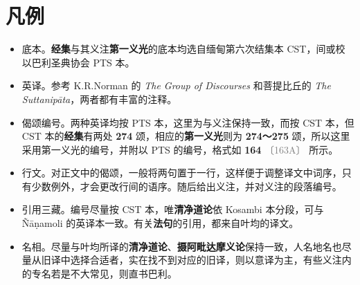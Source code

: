 \chapter{凡例}

\begin{itemize}
    \item 底本。\textbf{经集}与其义注\textbf{第一义光}的底本均选自缅甸第六次结集本 CST，间或校以巴利圣典协会 PTS 本。
    \item 英译。参考 K.R.Norman 的 \textit{The Group of Discourses} 和菩提比丘的 \textit{The Suttanipāta}，两者都有丰富的注释。
    \item 偈颂编号。两种英译均按 PTS 本，这里为与义注保持一致，而按 CST 本，但 CST 本的\textbf{经集}有两处 \textbf{274} 颂，相应的\textbf{第一义光}则为 \textbf{274～275} 颂，所以这里采用第一义光的编号，并附以 PTS 的编号，格式如 \textbf{164} \textcolor{gray}{\footnotesize 〔163A〕} 所示。
    \item 行文。对正文中的偈颂，一般将两句置于一行，这样便于调整译文中词序，只有少数例外，才会更改行间的语序。随后给出义注，并对义注的段落编号。
    \item 引用三藏。编号尽量按 CST 本，唯\textbf{清净道论}依 Kosambi 本分段，可与 Ñāṇamoli 的英译本一致。有关\textbf{法句}的引用，都来自叶均的译文。
    \item 名相。尽量与叶均所译的\textbf{清净道论}、\textbf{摄阿毗达摩义论}保持一致，人名地名也尽量从旧译中选择合适者，实在找不到对应的旧译，则以意译为主，有些义注内的专名若是不大常见，则直书巴利。
\end{itemize}